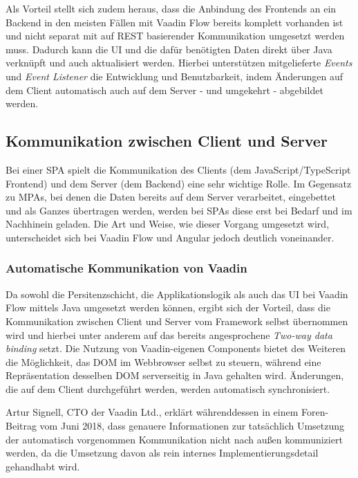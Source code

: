 \documentclass[a4paper,12pt,twoside]{scrreprt}
\begin{document}
Als Vorteil stellt sich zudem heraus, dass die Anbindung des Frontends an ein Backend in den meisten Fällen mit Vaadin Flow bereits komplett vorhanden ist und nicht separat mit auf REST basierender Kommunikation umgesetzt werden muss. Dadurch kann die \acs{UI} und die dafür benötigten Daten direkt über Java verknüpft und auch aktualisiert werden. Hierbei unterstützen mitgelieferte \textit{Events} und \textit{Event Listener} die Entwicklung und Benutzbarkeit, indem Änderungen auf dem Client automatisch auch auf dem Server - und umgekehrt - abgebildet werden. \parencite[][]{vaadin_ltd_overview_2021-2}

\subsection{Kommunikation zwischen Client und Server}
\label{sub-sec:kommunikation-client-server}
Bei einer \ac{SPA} spielt die Kommunikation des Clients (dem JavaScript/TypeScript Frontend) und dem Server (dem Backend) eine sehr wichtige Rolle. Im Gegensatz zu \acp{MPA}, bei denen die Daten bereits auf dem Server verarbeitet, eingebettet und als Ganzes übertragen werden, werden bei \acsp{SPA} diese erst bei Bedarf und im Nachhinein geladen. Die Art und Weise, wie dieser Vorgang umgesetzt wird, unterscheidet sich bei Vaadin Flow und Angular jedoch deutlich voneinander.

\subsubsection{Automatische Kommunikation von Vaadin}
\label{sub-sub-sec:kommunikation-herangehensweise-vaadin}
Da sowohl die Persitenzschicht, die Applikationslogik als auch das \acl{UI} bei Vaadin Flow mittels Java umgesetzt werden können, ergibt sich der Vorteil, dass die Kommunikation zwischen Client und Server vom Framework selbst übernommen wird und hierbei unter anderem auf das bereits angesprochene \textit{Two-way data binding} setzt. Die Nutzung von Vaadin-eigenen Components bietet des Weiteren die Möglichkeit, das \ac{DOM} im Webbrowser selbst zu steuern, während eine Repräsentation desselben \ac{DOM} serverseitig in Java gehalten wird. Änderungen, die auf dem Client durchgeführt werden, werden automatisch synchronisiert. \parencite[][Framework - Introduction - Core Concepts]{vaadin_ltd_documentation_nodate}

\medskip

Artur Signell, CTO der Vaadin Ltd., erklärt währenddessen in einem Foren-Beitrag vom Juni 2018, dass genauere Informationen zur tatsächlich Umsetzung der automatisch vorgenommen Kommunikation nicht nach außen kommuniziert werden, da die Umsetzung davon als rein internes Implementierungsdetail gehandhabt wird. \parencite[][]{signell_explanation_2018}
\end{document}
